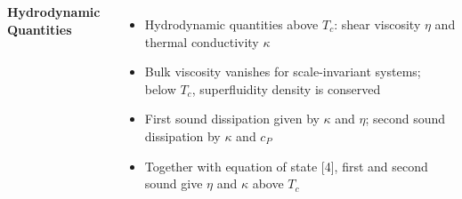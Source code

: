 \documentclass[26pt, paperwidth=36in,paperheight=48in]{tikzposter} %
\newcommand{\myfont}{\fontsize{24}{30}\selectfont}
\begin{document}
\begin{columns}
	
	
	
	


	
	
	
	

	
	\block[]{\textcolor{BEC1blue}{Hydrodynamics -- Transport Properties}}
	{
		\begin{minipage}{0.38\textwidth}
			\flushleft
			\textbf{Hydrodynamic Quantities}
			\vspace{0.5cm}
			\myfont
			\begin{itemize}
				\item Hydrodynamic quantities above $T_c$: shear viscosity $\eta$ and thermal conductivity $\kappa$
				
				\item Bulk viscosity vanishes for scale-invariant systems; below $T_c$, superfluidity density is conserved 
				
				\item First sound dissipation given by $\kappa$ and $\eta$; second sound dissipation by $\kappa$ and $c_P$
				
				\item Together with equation of state [4], first and second sound give $\eta$ and $\kappa$ above $T_c$
			\end{itemize}
		\end{minipage}
		
}
\end{columns}
\end{document}
